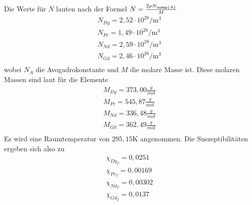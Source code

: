 Die Werte für $N$ lauten nach der Formel $N=\frac{2 \rho N_{\symup{A}}}{M}$
\begin{align*}
  N_{Dy} = 2,52 \cdot 10^{28} \si{\per\meter^3}\\
  N_{Pr} = 1,49 \cdot 10^{28} \si{\per\meter^3}\\
  N_{Nd} = 2,59 \cdot 10^{28} \si{\per\meter^3}\\
  N_{Gd} = 2,46 \cdot 10^{28} \si{\per\meter^3}\\
 \end{align*}
wobei $N_A$ die Avogadrokonstante und $M$ die molare Masse ist.
Diese molaren Massen sind laut \cite{sample1} für die Elemente
\begin{align*}
  M_{Dy} = 373,00 \frac{g}{mol} \\
  M_{Pr} = 545,87 \frac{g}{mol} \\
  M_{Nd} = 336,48 \frac{g}{mol} \\
  M_{Gd} = 362,49 \frac{g}{mol} \\
\end{align*}
Es wird eine Raumtemperatur von $295,15 \si{\kelvin}$ angenommen.
Die Suszeptibilitäten ergeben sich also zu
\begin{align*}
\chi_{Dy_T} = 0,0251 \\
\chi_{Pr_T} = 0,00169 \\
\chi_{Nd_T} = 0,00302 \\
\chi_{Gd_T} = 0,0137 \\
\end{align*}
